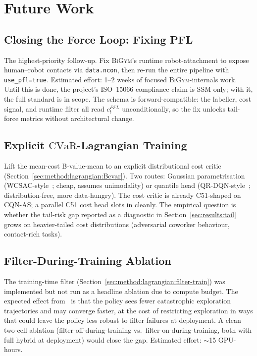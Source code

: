 \documentclass[11pt,a4paper]{report}
\newcommand{\ssm}{SSM}
\newcommand{\pfl}{PFL}
\newcommand{\iso}{ISO~15066}
\newcommand{\cvar}{\ensuremath{\mathrm{CVaR}}}
\newcommand{\bigym}{\textsc{BiGym}}
\newcommand{\cqnas}{CQN-AS}
\begin{document}
\chapter{Future Work}
\label{ch:future}

\section{Closing the Force Loop: Fixing \pfl{}}
\label{sec:fw:pfl}

The highest-priority follow-up. Fix \bigym{}'s runtime
robot-attachment to expose human--robot contacts via
\texttt{data.ncon}, then re-run the entire pipeline with
\texttt{use\_pfl=true}. Estimated effort: 1--2 weeks of focused
\bigym{}-internals work. Until this is done, the project's
\iso{} compliance claim is \ssm{}-only; with it, the full standard
is in scope. The schema is forward-compatible: the labeller, cost
signal, and runtime filter all read $c^{\pfl}_t$ unconditionally,
so the fix unlocks tail-force metrics without architectural change.

\section{Explicit \cvar{}-Lagrangian Training}
\label{sec:fw:cvar}

Lift the mean-cost B-value-mean to an explicit distributional cost
critic (Section~\ref{sec:method:lagrangian:Bcvar}). Two routes:
Gaussian parametrisation (WCSAC-style~\cite{yang2021wcsac}; cheap,
assumes unimodality) or quantile head (QR-DQN-style~\cite{dabney2018qrdqn};
distribution-free, more data-hungry). The cost critic is already
C51-shaped on \cqnas{}; a parallel C51 cost head slots in cleanly.
The empirical question is whether the tail-risk gap reported as a
diagnostic in Section~\ref{sec:results:tail} grows on
heavier-tailed cost distributions (adversarial coworker behaviour,
contact-rich tasks).

\section{Filter-During-Training Ablation}
\label{sec:fw:filter-during-training}

The training-time filter (Section~\ref{sec:method:lagrangian:filter-train})
was implemented but not run as a headline ablation due to compute
budget. The expected effect from~\cite{cbfrl2024,shield2025} is
that the policy sees fewer catastrophic exploration trajectories
and may converge faster, at the cost of restricting exploration in
ways that could leave the policy less robust to filter failures at
deployment. A clean two-cell ablation (filter-off-during-training
vs.\ filter-on-during-training, both with full hybrid at deployment)
would close the gap. Estimated effort: $\sim$15 GPU-hours.
\end{document}
